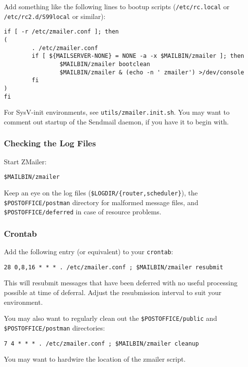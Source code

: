 Add something like the following lines to bootup scripts ({\tt /etc/rc.local}
or {\tt /etc/rc2.d/S99local} or similar):
\begin{verbatim}
if [ -r /etc/zmailer.conf ]; then
(
        . /etc/zmailer.conf
        if [ ${MAILSERVER-NONE} = NONE -a -x $MAILBIN/zmailer ]; then
                $MAILBIN/zmailer bootclean
                $MAILBIN/zmailer & (echo -n ' zmailer') >/dev/console
        fi
)
fi
\end{verbatim}

For SysV-init environments, see {\tt utils/zmailer.init.sh}.
You may want to comment out startup of the Sendmail daemon, if you have it to begin with.




\subsubsection{Checking the Log Files}

Start ZMailer:
\begin{verbatim}
$MAILBIN/zmailer
\end{verbatim}


Keep an eye on the log files ({\tt \$LOGDIR/\{router,scheduler\}}),
the {\tt \$POSTOFFICE/postman} directory for malformed message files,
and {\tt \$POSTOFFICE/deferred} in case of resource problems.




\subsubsection{Crontab}

Add the following entry (or equivalent) to your {\tt crontab}:
\begin{verbatim}
28 0,8,16 * * * . /etc/zmailer.conf ; $MAILBIN/zmailer resubmit
\end{verbatim}

This will resubmit messages that have been deferred with no
useful processing possible at time of deferral.  Adjust the
resubmission interval to suit your environment.

You may also want to regularly clean out the {\tt \$POSTOFFICE/public}
and {\tt \$POSTOFFICE/postman} directories:
\begin{verbatim}
7 4 * * * . /etc/zmailer.conf ; $MAILBIN/zmailer cleanup
\end{verbatim}

You may want to hardwire the location of the zmailer script.




